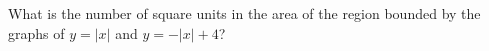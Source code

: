 What is the number of square units in the area of the region bounded by the graphs of $y=|x|$ and $y=-|x|+4$?
